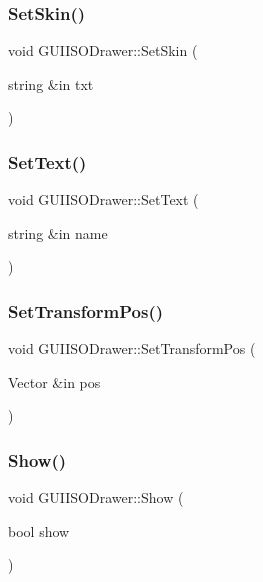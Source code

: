 \subsubsection{\texorpdfstring{Set\+Skin()}{SetSkin()}}
{\footnotesize\ttfamily void G\+U\+I\+I\+S\+O\+Drawer\+::\+Set\+Skin (\begin{DoxyParamCaption}\item[{string \&in}]{txt }\end{DoxyParamCaption})}

\hypertarget{class_g_u_i_i_s_o_drawer_a24d555974393de68b0826e1d8d3805c9}{}\label{class_g_u_i_i_s_o_drawer_a24d555974393de68b0826e1d8d3805c9} 
\subsubsection{\texorpdfstring{Set\+Text()}{SetText()}}
{\footnotesize\ttfamily void G\+U\+I\+I\+S\+O\+Drawer\+::\+Set\+Text (\begin{DoxyParamCaption}\item[{string \&in}]{name }\end{DoxyParamCaption})}

\hypertarget{class_g_u_i_i_s_o_drawer_a9fa78617a5ada045b826f6cc56047b04}{}\label{class_g_u_i_i_s_o_drawer_a9fa78617a5ada045b826f6cc56047b04} 
\subsubsection{\texorpdfstring{Set\+Transform\+Pos()}{SetTransformPos()}}
{\footnotesize\ttfamily void G\+U\+I\+I\+S\+O\+Drawer\+::\+Set\+Transform\+Pos (\begin{DoxyParamCaption}\item[{Vector \&in}]{pos }\end{DoxyParamCaption})}

\hypertarget{class_g_u_i_i_s_o_drawer_ac61217f81e03aab3e255a7b72a86d8f1}{}\label{class_g_u_i_i_s_o_drawer_ac61217f81e03aab3e255a7b72a86d8f1} 
\subsubsection{\texorpdfstring{Show()}{Show()}}
{\footnotesize\ttfamily void G\+U\+I\+I\+S\+O\+Drawer\+::\+Show (\begin{DoxyParamCaption}\item[{bool}]{show }\end{DoxyParamCaption})}




